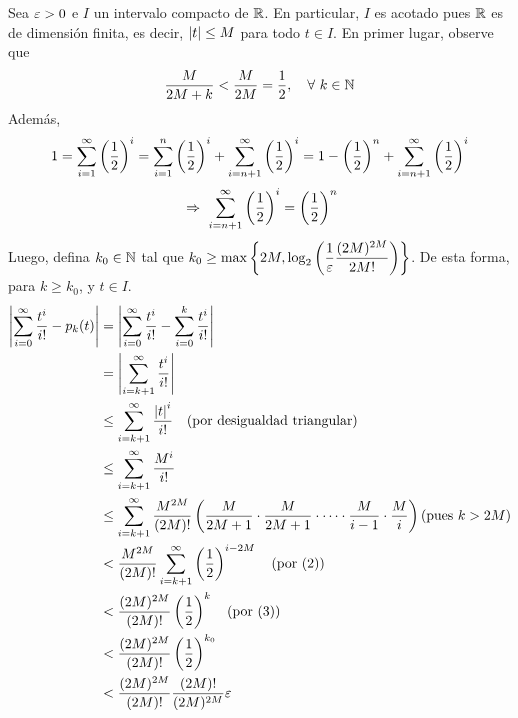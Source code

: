 \documentclass[../template.tex]{subfiles}
\begin{document}
\begin{demostracion}
        Sea $\varepsilon > 0$ e $I$ un intervalo compacto de $\mathbb{R}$. En particular, $I$ es acotado pues $\mathbb{R}$ es de dimensión finita, es decir, $\left\vert t \right\vert \leq M$ para todo $t \in I$. En primer lugar, observe que
            \begin{align}
                \frac{M}{2M + k} < \frac{M}{2M} = \frac{1}{2},\quad \forall\ k \in \mathbb{N}
            \end{align}
        Además,
            \begin{align*}
                1 = \sum_{i = 1}^{\infty} \left( \frac{1}{2} \right)^{i} = \sum_{i = 1}^{n} \left( \frac{1}{2} \right)^{i} + \sum_{i = n+1}^{\infty} \left( \frac{1}{2} \right)^{i} = 1 - \left( \frac{1}{2} \right)^{n} + \sum_{i = n+1}^{\infty} \left( \frac{1}{2} \right)^{i}\\
            \end{align*}
            \vspace{-4em}
            \begin{align}
                \ \Rightarrow\  \sum_{i = n+1}^{\infty} \left( \frac{1}{2} \right)^{i} = \left( \frac{1}{2} \right)^{n}
            \end{align}
        Luego, defina $k_0 \in \mathbb{N}$ tal que $\displaystyle k_0 \geq \max \left\lbrace 2M, \log_2 \left(  \frac{1}{\varepsilon} \frac{(2M)^{2M}}{2M!} \right) \right\rbrace$. De esta forma, para $k \geq k_0$, y $t \in I$.
            \begin{align*}
                \abs{ \sum_{i=0}^{\infty} \frac{t^i}{i!} - p_k(t)} &=
                \abs{\sum_{i=0}^{\infty} \frac{t^i}{i!} - \sum_{i=0}^{k} \frac{t^i}{i!}}\\
                &= \abs{\sum_{i=k+1}^{\infty} \frac{t^i}{i!}}\\
                &\leq \sum_{i=k+1}^{\infty} \frac{\abs{t}^i}{i!} \quad \text{(por desigualdad triangular)}\\
                &\leq \sum_{i=k+1}^{\infty} \frac{M^i}{i!}\\
                &\leq \sum_{i=k+1}^{\infty} \frac{M^{2M}}{(2M)!} \pare{ \frac{M}{2M+1} \cdot \frac{M}{2M+1} \cdot \dots \cdot \frac{M}{i-1} \cdot \frac{M}{i}} \text{(pues $k > 2M$)} \\
                &< \frac{M^{2M}}{(2M)!} \sum_{i=k+1}^{\infty} \pare{ \frac{1}{2} }^{i-2M} \quad \text{(por (2))}\\
                &< \frac{(2M)^{2M}}{(2M)!} \pare{\frac{1}{2}}^{k} \quad \text{(por (3))}\\
                &< \frac{(2M)^{2M}}{(2M)!} \pare{\frac{1}{2}}^{k_0}\\
                &< \frac{(2M)^{2M}}{(2M)!} \frac{(2M)!}{(2M)^{2M}} \eps\\

\end{align*}
\end{demostracion}
\end{document}

